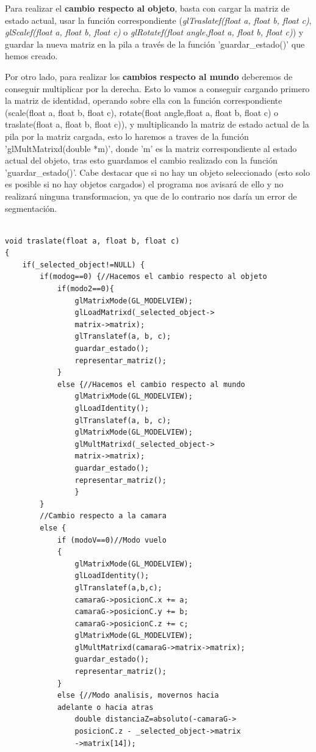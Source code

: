 \documentclass[12pt,a4paper]{article}
\begin{document}
\begin{enumerate}
Para realizar el \textbf{cambio respecto al objeto}, basta con cargar la matriz de estado actual, usar la función correspondiente (\textit{glTraslatef(float a, float b, float c)}, \textit{glScalef(float a, float b, float c)} o \textit{glRotatef(float angle,float a, float b, float c)}) y guardar la nueva matriz en la pila a través de la función 'guardar\_estado()' que hemos creado.\newline

Por otro lado, para realizar los \textbf{cambios respecto al mundo} deberemos de conseguir multiplicar por la derecha. Esto lo vamos a conseguir cargando primero la matriz de identidad, operando sobre ella con la función correspondiente (scale(float a, float b, float c), rotate(float angle,float a, float b, float c) o traslate(float a, float b, float c)), y multiplicando la matriz de estado actual de la pila por la matriz cargada, esto lo haremos a traves de la función 'glMultMatrixd(double *m)', donde 'm' es la matriz correspondiente al estado actual del objeto, tras esto guardamos el cambio realizado con la función 'guardar\_estado()'.\newline
Cabe destacar que si no hay un objeto seleccionado (esto solo es posible si no hay objetos cargados) el programa nos avisará de ello y no realizará ninguna transformacion, ya que de lo contrario nos daría un error de segmentación.\newline


\begin{lstlisting}

void traslate(float a, float b, float c)
{
    if(_selected_object!=NULL) {
        if(modog==0) {//Hacemos el cambio respecto al objeto
            if(modo2==0){
                glMatrixMode(GL_MODELVIEW);
                glLoadMatrixd(_selected_object->
                matrix->matrix);
                glTranslatef(a, b, c);
                guardar_estado();
                representar_matriz();
            }
            else {//Hacemos el cambio respecto al mundo
                glMatrixMode(GL_MODELVIEW);
                glLoadIdentity();
                glTranslatef(a, b, c);
                glMatrixMode(GL_MODELVIEW);
                glMultMatrixd(_selected_object->
                matrix->matrix);
                guardar_estado();
                representar_matriz();
                }
        }
        //Cambio respecto a la camara
        else {
        	if (modoV==0)//Modo vuelo
            {
	            glMatrixMode(GL_MODELVIEW);
	            glLoadIdentity();
	            glTranslatef(a,b,c);
	            camaraG->posicionC.x += a;
	            camaraG->posicionC.y += b;
	            camaraG->posicionC.z += c;
	            glMatrixMode(GL_MODELVIEW);
	            glMultMatrixd(camaraG->matrix->matrix);
	            guardar_estado();
	            representar_matriz();
	        }
	        else {//Modo analisis, movernos hacia
	        adelante o hacia atras
	        	double distanciaZ=absoluto(-camaraG->
	        	posicionC.z - _selected_object->matrix
	        	->matrix[14]);


\end{lstlisting}
\end{enumerate}
\end{document}
